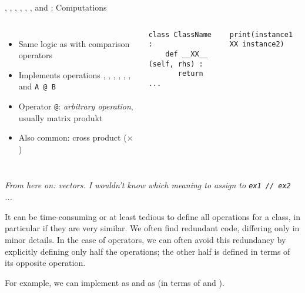 \begin{frame}[fragile]{, , , , , ,  and : Computations}
%
\begin{columns}[T]
\begin{itemize}
\item Same logic as with comparison operators
\item Implements operations , , , , , ,  and \texttt{A @ B}
\item Operator \texttt{@}: \emph{arbitrary operation}, usually matrix produkt
\item Also common: cross product ($\times$)
\end{itemize}
%
\vspace{-6pt}
\begin{codebox}
\begin{verbatim}
class ClassName :
    def __XX__ (self, rhs) :
       return ...
\end{verbatim}
\end{codebox}
%
\begin{codebox}
\begin{verbatim}
print(instance1 XX instance2)
\end{verbatim}
\end{codebox}
\end{columns}

\vspace{12pt}
\emph{From here on: vectors. I wouldn't know which meaning to assign to \texttt{ex1 // ex2} ...}
%
\end{frame}


\begin{frame}
%
\begin{hintbox}
It can be time-consuming or at least tedious to define all operations for a class, in particular if they are very similar. We often find redundant code, differing only in minor details. In the case of operators, we can often avoid this redundancy by explicitly defining only half the operations; the other half is defined in terms of its opposite operation.

For example, we can implement  as  and  as  (\ie in terms of  and ).
\end{hintbox}
%
\end{frame}

